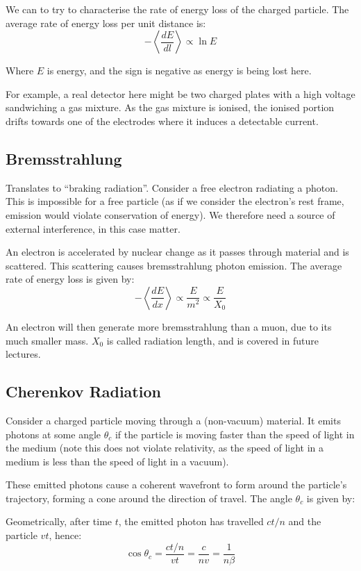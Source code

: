 We can to try to characterise the rate of energy loss of the charged particle. The average rate of energy loss per unit distance is:
\[
    -\left\langle \frac{dE}{dl}\right\rangle \propto \ln E
\]

Where $E$ is energy, and the sign is negative as energy is being lost here.

For example, a real detector here might be two charged plates with a high voltage sandwiching a gas mixture. As the gas mixture is ionised, the ionised portion drifts towards one of the electrodes where it induces a detectable current.

\subsection{Bremsstrahlung}

Translates to ``braking radiation''. Consider a free electron radiating a photon. This is impossible for a free particle (as if we consider the electron's rest frame, emission would violate conservation of energy). We therefore need a source of external interference, in this case matter. 

An electron is accelerated by nuclear change as it passes through material and is scattered. This scattering causes bremsstrahlung photon emission. The average rate of energy loss is given by:
\[
    - \left< \frac{dE}{dx} \right> \propto \frac{E}{m^2} \propto \frac{E}{X_0}
\]

An electron will then generate more bremsstrahlung than a muon, due to its much smaller mass. $X_0$ is called radiation length, and is covered in future lectures.

\subsection{Cherenkov Radiation}
Consider a charged particle moving through a (non-vacuum) material. It emits photons at some angle $\theta_c$ if the particle is moving faster than the speed of light in the medium (note this does not violate relativity, as the speed of light in a medium is less than the speed of light in a vacuum).

These emitted photons cause a coherent wavefront to form around the particle's trajectory, forming a cone around the direction of travel. The angle $\theta_c$ is given by:

Geometrically, after time $t$, the emitted photon has travelled $ct/n$ and the particle $vt$, hence:
\[
    \cos \theta_c = \frac{ct/n}{vt} = \frac{c}{nv} = \frac{1}{n \beta}
\]


